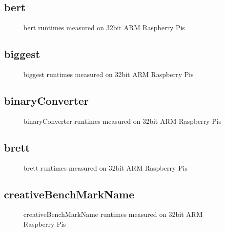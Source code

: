 \newpage
\subsection{bert}
    
    \begin{figure}[h]
	    \centering
		
        \caption{bert runtimes measured on 32bit ARM Raspberry Pis}
	\end{figure}
    


\newpage
\subsection{biggest}
    
    \begin{figure}[h]
	    \centering
		
        \caption{biggest runtimes measured on 32bit ARM Raspberry Pis}
	\end{figure}
    


\newpage
\subsection{binaryConverter}
    
    \begin{figure}[h]
	    \centering
		
        \caption{binaryConverter runtimes measured on 32bit ARM Raspberry Pis}
	\end{figure}
    


\newpage
\subsection{brett}
    
    \begin{figure}[h]
	    \centering
		
        \caption{brett runtimes measured on 32bit ARM Raspberry Pis}
	\end{figure}
    


\newpage
\subsection{creativeBenchMarkName}
    
    \begin{figure}[h]
	    \centering
		
        \caption{creativeBenchMarkName runtimes measured on 32bit ARM Raspberry Pis}
	\end{figure}
    


